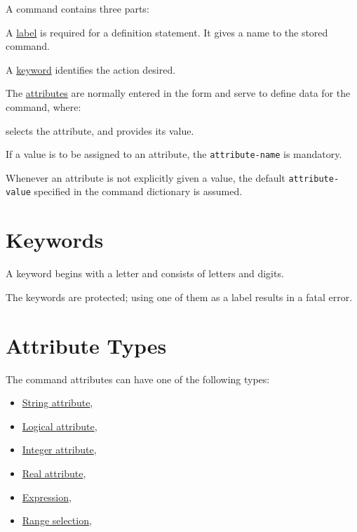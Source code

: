 A command contains three parts:
\begin{madlist}
   A \href{label.html}{label} is required for a definition statement. 
   It gives a name to the stored command.
     
   A \href{keyword.html}{keyword} identifies the action desired.
     
   The \href{attribute.html}{attributes} are normally entered in the
   form 
   and serve to define data for the command, where:
   \begin{madlist}
        selects the attribute, and
        provides its value.       
   \end{madlist}
\end{madlist}

If a value is to be assigned to an attribute, the {\tt attribute-name} is
mandatory.

Whenever an attribute is not explicitly given a value, the default 
{\tt attribute-value} specified in the command dictionary is assumed. 


\section{Keywords}
\label{subsec:keyword}

A keyword begins with a letter and consists of letters and digits. 

The \madx keywords are protected; using one of them as a label results
in a fatal error.   


\section{Attribute Types}
The command attributes can have one of the following types:
\begin{itemize}
  \item \href{string.html}{String attribute},
  \item \href{logical.html}{Logical attribute},
  \item \href{integer.html}{Integer attribute},
  \item \href{real.html}{Real attribute},
  \item \href{expression.html}{Expression},
  \item \href{select.html}{Range selection},
\end{itemize}

